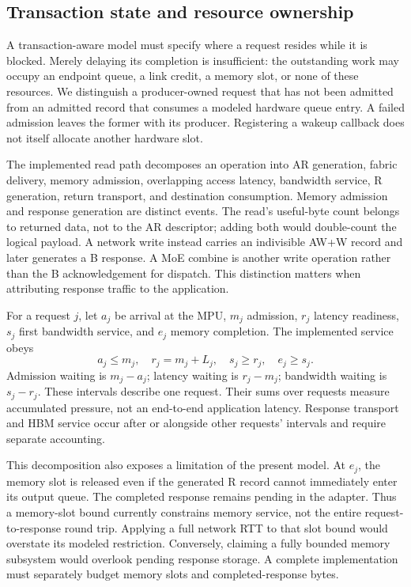 \subsection{Transaction state and resource ownership}
A transaction-aware model must specify where a request resides while it is blocked. Merely delaying its completion is insufficient: the outstanding work may occupy an endpoint queue, a link credit, a memory slot, or none of these resources. We distinguish a producer-owned request that has not been admitted from an admitted record that consumes a modeled hardware queue entry. A failed admission leaves the former with its producer. Registering a wakeup callback does not itself allocate another hardware slot.

The implemented read path decomposes an operation into AR generation, fabric delivery, memory admission, overlapping access latency, bandwidth service, R generation, return transport, and destination consumption. Memory admission and response generation are distinct events. The read's useful-byte count belongs to returned data, not to the AR descriptor; adding both would double-count the logical payload. A network write instead carries an indivisible AW+W record and later generates a B response. A MoE combine is another write operation rather than the B acknowledgement for dispatch. This distinction matters when attributing response traffic to the application.

For a request $j$, let $a_j$ be arrival at the MPU, $m_j$ admission, $r_j$ latency readiness, $s_j$ first bandwidth service, and $e_j$ memory completion. The implemented service obeys
\begin{equation}
 a_j\leq m_j,\quad r_j=m_j+L_j,\quad s_j\geq r_j,\quad e_j\geq s_j.
\end{equation}
Admission waiting is $m_j-a_j$; latency waiting is $r_j-m_j$; bandwidth waiting is $s_j-r_j$. These intervals describe one request. Their sums over requests measure accumulated pressure, not an end-to-end application latency. Response transport and HBM service occur after or alongside other requests' intervals and require separate accounting.

This decomposition also exposes a limitation of the present model. At $e_j$, the memory slot is released even if the generated R record cannot immediately enter its output queue. The completed response remains pending in the adapter. Thus a memory-slot bound currently constrains memory service, not the entire request-to-response round trip. Applying a full network RTT to that slot bound would overstate its modeled restriction. Conversely, claiming a fully bounded memory subsystem would overlook pending response storage. A complete implementation must separately budget memory slots and completed-response bytes.

